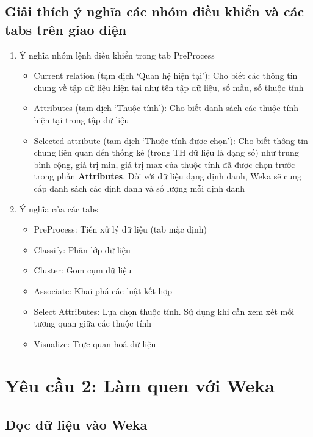 \documentclass[a4paper, 12pt]{article}
\begin{document}
\subsection{Giải thích ý nghĩa các nhóm điều khiển và các tabs trên giao diện}
\begin{enumerate}
    \item Ý nghĩa nhóm lệnh điều khiển trong tab PreProcess
    \begin{itemize}
        \item Current relation (tạm dịch `Quan hệ hiện tại'): Cho biết các thông tin chung về tập dữ liệu hiện tại như tên tập dữ liệu, số mẫu, số thuộc tính
        \item Attributes (tạm dịch `Thuộc tính'): Cho biết danh sách các thuộc tính hiện tại trong tập dữ liệu
        \item Selected attribute (tạm dịch `Thuộc tính được chọn'): Cho biết thông tin chung liên quan đến thống kê (trong TH dữ liệu là dạng số) như trung bình cộng, giá trị min, giá trị max của thuộc tính đã được chọn trước trong phần \textbf{Attributes}. Đối với dữ liệu dạng định danh, Weka sẽ cung cấp danh sách các định danh và số lượng mỗi định danh
    \end{itemize}

    \item Ý nghĩa của các tabs
    \begin{itemize}
        \item PreProcess: Tiền xử lý dữ liệu (tab mặc định)
        \item Classify: Phân lớp dữ liệu
        \item Cluster: Gom cụm dữ liệu
        \item Associate: Khai phá các luật kết hợp
        \item Select Attributes: Lựa chọn thuộc tính. Sử dụng khi cần xem xét mối tương quan giữa các thuộc tính
        \item Visualize: Trực quan hoá dữ liệu
    \end{itemize}
\end{enumerate}

\section{Yêu cầu 2: Làm quen với Weka}

\subsection{Đọc dữ liệu vào Weka}
\end{document}
